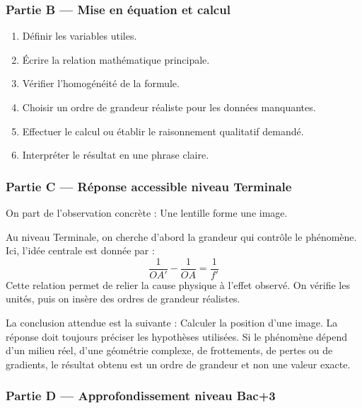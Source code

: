 \documentclass[11pt,a4paper]{article}
\begin{document}
\subsubsection*{Partie B — Mise en équation et calcul}

\begin{enumerate}
  \item Définir les variables utiles.
  \item Écrire la relation mathématique principale.
  \item Vérifier l'homogénéité de la formule.
  \item Choisir un ordre de grandeur réaliste pour les données manquantes.
  \item Effectuer le calcul ou établir le raisonnement qualitatif demandé.
  \item Interpréter le résultat en une phrase claire.
\end{enumerate}

\subsubsection*{Partie C — Réponse accessible niveau Terminale}

\begin{corrigebox}
On part de l'observation concrète : Une lentille forme une image.

Au niveau Terminale, on cherche d'abord la grandeur qui contrôle le phénomène. Ici, l'idée centrale est donnée par :
\[
\frac1{OA'}-\frac1{OA}=\frac1{f'}
\]
Cette relation permet de relier la cause physique à l'effet observé. On vérifie les unités, puis on insère des ordres de grandeur réalistes.

La conclusion attendue est la suivante : Calculer la position d'une image. La réponse doit toujours préciser les hypothèses utilisées. Si le phénomène dépend d'un milieu réel, d'une géométrie complexe, de frottements, de pertes ou de gradients, le résultat obtenu est un ordre de grandeur et non une valeur exacte.
\end{corrigebox}

\subsubsection*{Partie D — Approfondissement niveau Bac+3}
\end{document}
